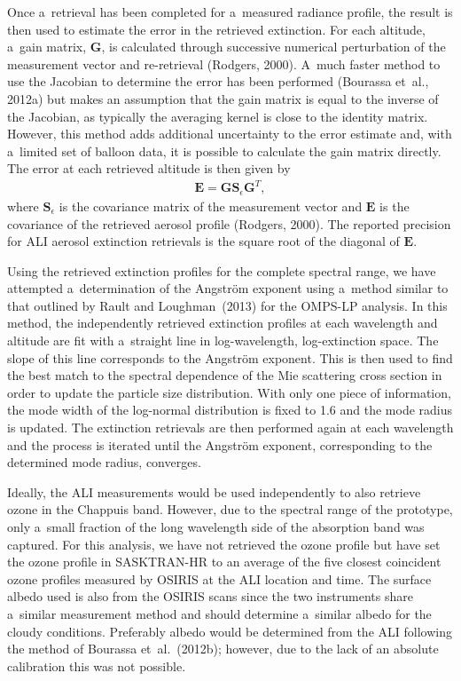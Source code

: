 \documentclass[amt]{copernicus}
\begin{document}
Once a~retrieval has been completed for a~measured radiance profile,
the result is then used to estimate the error in the retrieved
extinction. For each altitude, a~gain matrix, $\mathbf{G}$, is
calculated through successive numerical perturbation of the
measurement vector and re-retrieval (Rodgers, 2000). A~much faster
method to use the Jacobian to determine the error has been performed
(Bourassa et~al., 2012a) but makes an assumption that the gain matrix
is equal to the inverse of the Jacobian, as typically the averaging
kernel is close to the identity matrix. However, this method adds
additional uncertainty to the error estimate and, with a~limited set of
balloon data, it is possible to calculate the gain matrix
directly. The error at each retrieved altitude is then given by
\begin{align}
\mathbf{E}=\mathbf{G}\mathbf{S}_{\epsilon} \mathbf{G}^{T},
\end{align}
where $\mathbf{S}_{\epsilon}$ is the covariance matrix of the
measurement vector and $\mathbf{E}$ is the covariance of the retrieved
aerosol profile (Rodgers, 2000). The reported precision for ALI
aerosol extinction retrievals is the square root of the diagonal of
$\mathbf{E}$.



Using the retrieved extinction profiles for the complete spectral
range, we have attempted a~determination of the Angstr\"{o}m exponent
using a~method similar to that outlined by Rault and Loughman~(2013)
for the OMPS-LP analysis. In this method, the independently retrieved
extinction profiles at each wavelength and altitude are fit with
a~straight line in log-wavelength, log-extinction space. The slope of
this line corresponds to the Angstr\"{o}m exponent. This is then used to
find the best match to the spectral dependence of the Mie scattering
cross section in order to update the particle size distribution. With
only one piece of information, the mode width of the log-normal
distribution is fixed to 1.6 and the mode radius is updated. The
extinction retrievals are then performed again at each wavelength and
the process is iterated until the Angstr\"{o}m exponent, corresponding to
the determined mode radius, converges.

Ideally, the ALI measurements would be used independently to also
retrieve ozone in the Chappuis band. However, due to the spectral
range of the prototype, only a~small fraction of the long wavelength
side of the absorption band was captured. For this analysis, we have
not retrieved the ozone profile but have set the ozone profile in
SASKTRAN-HR to an average of the five closest coincident ozone
profiles measured by OSIRIS at the ALI location and time. The surface
albedo used is also from the OSIRIS scans since the two instruments
share a~similar measurement method and should determine a~similar
albedo for the cloudy conditions. Preferably albedo would be
determined from the ALI following the method of Bourassa
et~al.~(2012b); however, due to the lack of an absolute calibration
this was not possible.
\end{document}
